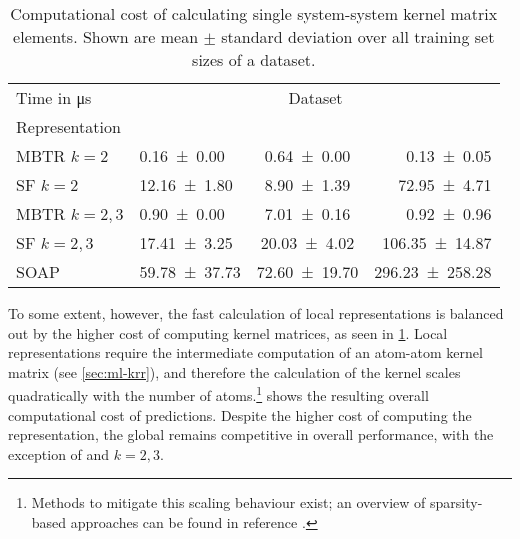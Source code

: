 \begin{table}
	\caption{Computational cost of calculating single system-system kernel matrix elements.
		Shown are mean $\pm$ standard deviation over all training set sizes of a dataset.
		}
		\label{tab:repsbench-compcosts_kernel}

	\begin{tabular}[b]{@{}llcr@{}}
		\toprule
		Time in \unit{\micro\second} & \multicolumn{3}{c}{Dataset} \\ \cmidrule(lr){2-4}
		Representation & \multicolumn{1}{c}{\dsgdb} & \multicolumn{1}{c}{\dsba} & \multicolumn{1}{c}{\dstco} \\
		\midrule
		MBTR $k=2$ & \num{0.16 \pm 0.00 } & \num{0.64 \pm 0.00 } & \num{0.13 \pm 0.05 } \\
		SF $k=2$ & \num{12.16 \pm 1.80 } & \num{8.90 \pm 1.39 } & \num{72.95 \pm 4.71 } \\
		MBTR $k=2,3$ & \num{0.90 \pm 0.00 } & \num{7.01 \pm 0.16 } & \num{0.92 \pm 0.96 } \\
		SF $k=2,3$ & \num{17.41 \pm 3.25 } & \num{20.03 \pm 4.02 } & \num{106.35 \pm 14.87 } \\
		SOAP & \num{59.78 \pm 37.73 } & \num{72.60 \pm 19.70 } & \num{296.23 \pm 258.28 } \\
		\bottomrule
	\end{tabular}
\end{table}

To some extent, however, the fast calculation of local representations is balanced out by the higher cost of computing kernel matrices, as seen in \cref{tab:repsbench-compcosts_kernel}. Local representations require the intermediate computation of an atom-atom kernel matrix (see \cref{sec:ml-krr}), and therefore the calculation of the kernel scales quadratically with the number of atoms.\footnote[][-1\baselineskip]{Methods to mitigate this scaling behaviour exist; an overview of sparsity-based approaches can be found in reference \cite{dbcc2021q}.
}
 shows the resulting overall computational cost of predictions. Despite the higher cost of computing the representation, the global \mbtr{} remains competitive in overall performance, with the exception of \dstco and $k{=}2,3$.

